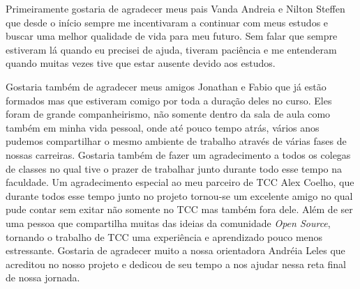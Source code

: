\begin{agradecimentos}
Primeiramente gostaria de agradecer meus pais Vanda Andreia e Nilton Steffen que desde o início sempre me incentivaram a continuar com meus estudos e buscar uma melhor qualidade de vida para meu futuro. Sem falar que sempre estiveram lá quando eu precisei de ajuda, tiveram paciência e me entenderam quando muitas vezes tive que estar ausente devido aos estudos.

Gostaria também de agradecer meus amigos Jonathan e Fabio que já estão formados mas que estiveram comigo por toda a duração deles no curso. Eles foram de grande companheirismo, não somente dentro da sala de aula como também em minha vida pessoal, onde até pouco tempo atrás, vários anos pudemos compartilhar o mesmo ambiente de trabalho através de várias fases de nossas carreiras. Gostaria também de fazer um agradecimento a todos os colegas de classes no qual tive o prazer de trabalhar junto durante todo esse tempo na faculdade.
Um agradecimento especial ao meu parceiro de TCC Alex Coelho, que durante todos esse tempo junto no projeto tornou-se um excelente amigo no qual pude contar sem exitar não somente no TCC mas também fora dele. Além de ser uma pessoa que compartilha muitas das ideias da comunidade \textit{Open Source}, tornando o trabalho de TCC uma experiência e aprendizado pouco menos estressante. Gostaria de agradecer muito a nossa orientadora Andréia Leles que acreditou no nosso projeto e dedicou de seu tempo a nos ajudar nessa reta final de nossa jornada.
\end{agradecimentos}